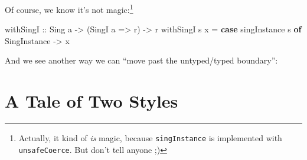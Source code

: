 \documentclass[]{article}
\newenvironment{Shaded}{}{}
\newcommand{\KeywordTok}[1]{\textcolor[rgb]{0.00,0.44,0.13}{\textbf{{#1}}}}
\newcommand{\DataTypeTok}[1]{\textcolor[rgb]{0.56,0.13,0.00}{{#1}}}
\newcommand{\DecValTok}[1]{\textcolor[rgb]{0.25,0.63,0.44}{{#1}}}
\newcommand{\StringTok}[1]{\textcolor[rgb]{0.25,0.44,0.63}{{#1}}}
\newcommand{\CommentTok}[1]{\textcolor[rgb]{0.38,0.63,0.69}{\textit{{#1}}}}
\newcommand{\OtherTok}[1]{\textcolor[rgb]{0.00,0.44,0.13}{{#1}}}
\newcommand{\FunctionTok}[1]{\textcolor[rgb]{0.02,0.16,0.49}{{#1}}}
\newcommand{\NormalTok}[1]{{#1}}
\begin{document}
Of course, we know it's not magic:\footnote{Actually, it kind of \emph{is}
  magic, because \texttt{singInstance} is implemented with
  \texttt{unsafeCoerce}. But don't tell anyone ;)}

\begin{Shaded}
\begin{Highlighting}[]
\OtherTok{withSingI ::} \DataTypeTok{Sing} \NormalTok{a }\OtherTok{->} \NormalTok{(}\DataTypeTok{SingI} \NormalTok{a }\OtherTok{=>} \NormalTok{r) }\OtherTok{->} \NormalTok{r}
\NormalTok{withSingI s x }\FunctionTok{=} \KeywordTok{case} \NormalTok{singInstance s }\KeywordTok{of}
                  \DataTypeTok{SingInstance} \OtherTok{->} \NormalTok{x}
\end{Highlighting}
\end{Shaded}

And we see another way we can ``move past the untyped/typed boundary'':

\begin{Shaded}
\end{Shaded}

\section{A Tale of Two Styles}\label{a-tale-of-two-styles}
\end{document}
